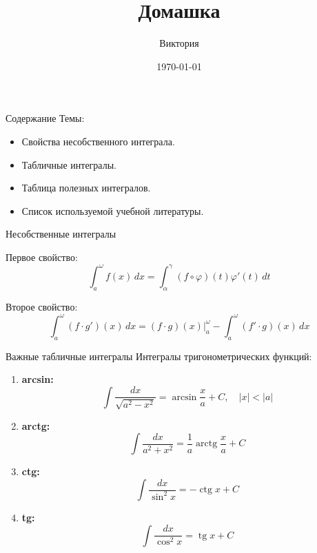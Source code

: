 \documentclass{beamer}
\title{Домашка}
\author{Виктория}
\date{\today}
\begin{document}
\begin{frame}
\maketitle
\end{frame}

\begin{frame}{Содержание}
 Темы:
\begin{itemize}
    \item Свойства несобственного интеграла.
    \item Табличные интегралы.
    \item Таблица полезных интегралов.
    \item Список используемой учебной литературы.
\end{itemize}
\end{frame}

\begin{frame}{Несобственные интегралы}

\begin{block}{Первое свойство:}
\begin{equation}
\int_{a}^{\omega} f(x) \, dx = \int_{\alpha}^{\gamma} (f \circ \varphi)(t) \varphi'(t) \, dt  
\end{equation}
\end{block}

\begin{block}{Второе свойство:}
\begin{equation}
\int_{a}^{\omega} (f \cdot g')(x) \, dx = (f \cdot g)(x)\big|_{a}^{\omega} - \int_{a}^{\omega} (f' \cdot g)(x) \, dx
\end{equation}
\end{block}
\end{frame}


\begin{frame}{Важные табличные интегралы}
Интегралы тригонометрических функций:
\begin{enumerate} 
    \item \textbf{arcsin:} 
   $$\int \frac{dx}{\sqrt{a^2 - x^2}} = \arcsin \frac{x}{a} + C, \quad |x| < |a|$$
    \item \textbf{arctg:} 
   $$\int \frac{dx}{a^2 + x^2} = \frac{1}{a} \operatorname{arctg} \frac{x}{a} + C$$
    \item \textbf{ctg:} 
    $$\int \frac{dx}{\sin^2 x} = -\operatorname{ctg} x + C$$
    \item \textbf{tg:}
    $$\int \frac{dx}{\cos^2 x} = \operatorname{tg} x + C$$
\end{enumerate} 
\end{frame}
\end{document}
